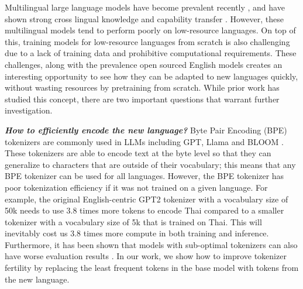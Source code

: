 Multilingual large language models have become prevalent recently \cite{workshop2023bloom, muennighoff2023crosslingual, xue2021mt5, conneau2020unsupervised, goyal2021largerscale, shliazhko2022mgpt}, and have shown strong cross lingual knowledge and capability transfer \cite{lin2022fewshot, xu2021bert, yong2023bloom1, phang2020english, ebrahimi2021adapt, ye2023language, armengolestapé2021multilingual}. However, these multilingual models tend to perform poorly on low-resource languages. On top of this, training models for low-resource languages from scratch is also challenging due to a lack of training data and prohibitive computational requirements. These challenges, along with the prevalence open sourced English models creates an interesting opportunity to see how they can be adapted to new languages quickly, without wasting resources by pretraining from scratch. While prior work \cite{yong2023bloom1, phang2020english, ebrahimi2021adapt, ogueji2021small, armengolestapé2021multilingual} has studied this concept, there are two important questions that warrant further investigation.

\textbf{\emph{How to efficiently encode the new language?}} Byte Pair Encoding (BPE) \cite{gage1994new} tokenizers are commonly used in LLMs including GPT\cite{radford2019language, brown2020language}, Llama \cite{touvron2023llama, touvron2023llama2} and BLOOM \cite{workshop2023bloom, muennighoff2023crosslingual}. These tokenizers are able to encode text at the byte level so that they can generalize to characters that are outside of their vocabulary; this means that any BPE tokenizer can be used for all languages. However, the BPE tokenizer has poor tokenization efficiency if it was not trained on a given language. For example, the original English-centric GPT2 tokenizer with a vocabulary size of 50k needs to use 3.8 times more tokens to encode Thai compared to a smaller tokenizer with a vocabulary size of 5k that is trained on Thai. This will inevitably cost us 3.8 times more compute in both training and inference. Furthermore, it has been shown that models with sub-optimal tokenizers can also have worse evaluation results \cite{rust2021good, stollenwerk2023training}.
In our work, we show how to improve tokenizer fertility\cite{acs2019} by replacing the least frequent tokens in the base model with tokens from the new language.

